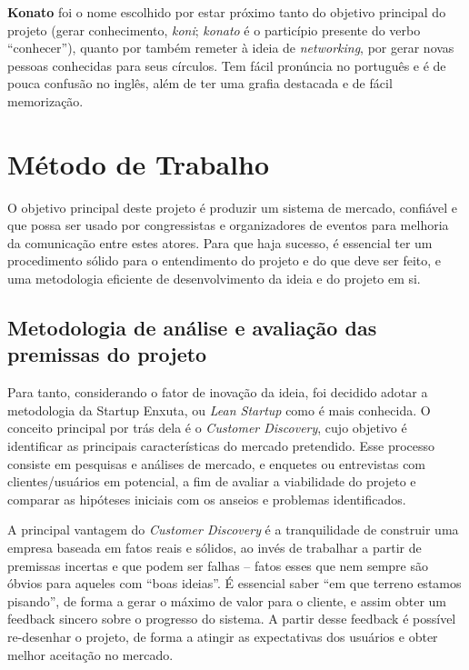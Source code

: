 \documentclass[12pt,a4paper,twoside,hyphens,english,brazil]{abntex2}
\begin{document}
\textbf{Konato} foi o nome escolhido por estar próximo tanto do objetivo principal do projeto (gerar conhecimento, \emph{koni}; \emph{konato} é o particípio presente do verbo ``conhecer''), quanto por também remeter à ideia de \emph{networking}, por gerar novas pessoas conhecidas para seus círculos. Tem fácil pronúncia no português e é de pouca confusão no inglês, além de ter uma grafia destacada e de fácil memorização.


\section{Método de Trabalho}
O objetivo principal deste projeto é produzir um sistema de mercado, confiável e que possa ser usado por congressistas e organizadores de eventos para melhoria da comunicação entre estes atores. Para que haja sucesso, é essencial ter um procedimento sólido para o entendimento do projeto e do que deve ser feito, e uma metodologia eficiente de desenvolvimento da ideia e do projeto em si.

\subsection{Metodologia de análise e avaliação das premissas do projeto}
Para tanto, considerando o fator de inovação da ideia, foi decidido adotar a metodologia da Startup Enxuta, ou \emph{Lean Startup} como é mais conhecida. O conceito principal por trás dela é o \emph{Customer Discovery}\cite{manual-startup}, cujo objetivo é identificar as principais características do mercado pretendido. Esse processo consiste em pesquisas e análises de mercado, e enquetes ou entrevistas com clientes/usuários em potencial, a fim de avaliar a viabilidade do projeto e comparar as hipóteses iniciais com os anseios e problemas identificados.

A principal vantagem do \emph{Customer Discovery} é a tranquilidade de construir uma empresa baseada em fatos reais e sólidos, ao invés de trabalhar a partir de premissas incertas e que podem ser falhas -- fatos esses que nem sempre são óbvios para aqueles com ``boas ideias''. É essencial saber ``em que terreno estamos pisando'', de forma a gerar o máximo de valor para o cliente, e assim obter um feedback sincero sobre o progresso do sistema. A partir desse feedback é possível re-desenhar o projeto, de forma a atingir as expectativas dos usuários e obter melhor aceitação no mercado.
\end{document}
